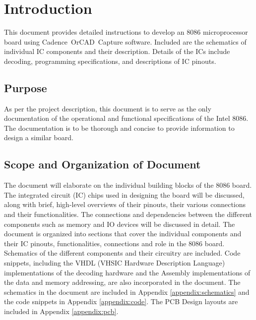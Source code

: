 \newpage
\section{Introduction}
This document provides detailed instructions to develop an 8086 microprocessor board using Cadence\textregistered \ OrCAD\textregistered \ Capture software. Included are the schematics of individual IC components and their description. Details of the ICs include decoding, programming specifications, and descriptions of IC pinouts.

    \subsection{Purpose}
    As per the project description, this document is to serve as the only documentation of the operational and functional specifications of the Intel 8086. The documentation is to be thorough and concise to provide information to design a similar board.

    \subsection{Scope and Organization of Document}
    The document will elaborate on the individual building blocks of the 8086 board. The integrated circuit (IC) chips used in designing the board will be discussed, along with brief, high-level overviews of their pinouts, their various connections and their functionalities. The connections and dependencies between the different components such as memory and IO devices will be discussed in detail.\n
    The document is organized into sections that cover the individual components and their IC pinouts, functionalities, connections and role in the 8086 board. Schematics of the different components and their circuitry are included. Code snippets, including the VHDL (VHSIC Hardware Description Language) implementations of the decoding hardware and the Assembly implementations of the data and memory addressing, are also incorporated in the document.\n
    The schematics in the document are included in Appendix \ref{appendix:schematics} and the code snippets in Appendix \ref{appendix:code}. The PCB Design layouts are included in Appendix \ref{appendix:pcb}.
